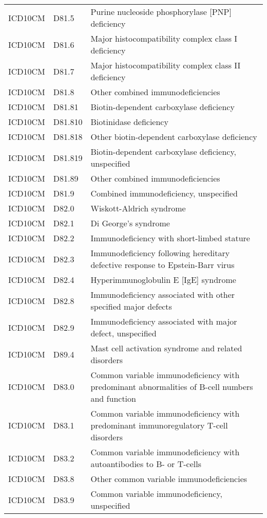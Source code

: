\begin{longtable}{p{}p{}p{}}
  ICD10CM & D81.5 & Purine nucleoside phosphorylase [PNP] deficiency \\ 
  ICD10CM & D81.6 & Major histocompatibility complex class I deficiency \\ 
  ICD10CM & D81.7 & Major histocompatibility complex class II deficiency \\ 
  ICD10CM & D81.8 & Other combined immunodeficiencies \\ 
  ICD10CM & D81.81 & Biotin-dependent carboxylase deficiency \\ 
  ICD10CM & D81.810 & Biotinidase deficiency \\ 
  ICD10CM & D81.818 & Other biotin-dependent carboxylase deficiency \\ 
  ICD10CM & D81.819 & Biotin-dependent carboxylase deficiency, unspecified \\ 
  ICD10CM & D81.89 & Other combined immunodeficiencies \\ 
  ICD10CM & D81.9 & Combined immunodeficiency, unspecified \\ 
  ICD10CM & D82.0 & Wiskott-Aldrich syndrome \\ 
  ICD10CM & D82.1 & Di George's syndrome \\ 
  ICD10CM & D82.2 & Immunodeficiency with short-limbed stature \\ 
  ICD10CM & D82.3 & Immunodeficiency following hereditary defective response to Epstein-Barr virus \\ 
  ICD10CM & D82.4 & Hyperimmunoglobulin E [IgE] syndrome \\ 
  ICD10CM & D82.8 & Immunodeficiency associated with other specified major defects \\ 
  ICD10CM & D82.9 & Immunodeficiency associated with major defect, unspecified \\ 
  ICD10CM & D89.4 & Mast cell activation syndrome and related disorders \\ 
  ICD10CM & D83.0 & Common variable immunodeficiency with predominant abnormalities of B-cell numbers and function \\ 
  ICD10CM & D83.1 & Common variable immunodeficiency with predominant immunoregulatory T-cell disorders \\ 
  ICD10CM & D83.2 & Common variable immunodeficiency with autoantibodies to B- or T-cells \\ 
  ICD10CM & D83.8 & Other common variable immunodeficiencies \\ 
  ICD10CM & D83.9 & Common variable immunodeficiency, unspecified \\ 

\end{longtable}
